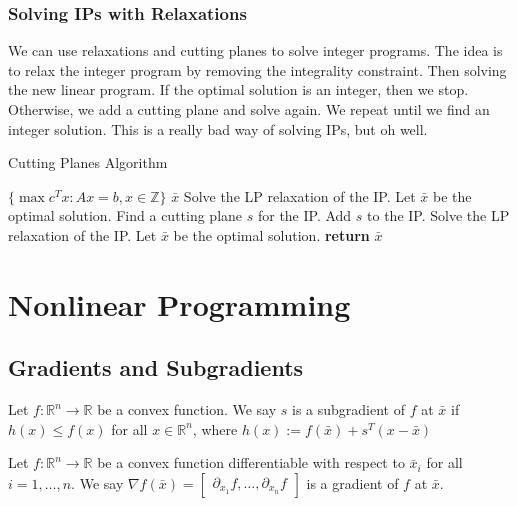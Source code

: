 \documentclass[a4paper]{report}
\begin{document}
\subsection{Solving IPs with Relaxations}
We can use relaxations and cutting planes to solve integer programs. The idea is to relax the integer program by removing the integrality constraint. Then solving the new linear program. If the optimal solution is an integer, then we stop. Otherwise, we add a cutting plane and solve again. We repeat until we find an integer solution. This is a really bad way of solving IPs, but oh well.

\begin{algorithm}
  \algrenewcommand{}
  \algrenewcommand{}
  \caption{Cutting Planes Algorithm}
  \label{alg:cut}
  \begin{algorithmic}[1]
    \Require $\{\max c^Tx : Ax = b, x \in \mathbb Z\}$
    \Ensure $\bar x$
    \State Solve the LP relaxation of the IP. Let $\bar x$ be the optimal solution.
      \State Find a cutting plane $s$ for the IP.
      \State Add $s$ to the IP.
      \State Solve the LP relaxation of the IP. Let $\bar x$ be the optimal solution.
    \EndWhile
    \State \textbf{return} $\bar x$
  \end{algorithmic}
\end{algorithm}


\chapter{Nonlinear Programming}
\section{Gradients and Subgradients}
\begin{definition}[Subgradient]\label{subgradient}
  Let $f : \mathbb R^n \rightarrow \mathbb R$ be a convex function. We say $s$ is a subgradient of $f$ at $\bar x$ if $h(x) \leq f(x)$ for all $x \in \mathbb R^n$, where $h(x) := f(\bar x) + s^T (x - \bar x)$
\end{definition}
\begin{definition}[Gradient]
  Let $f : \mathbb R^n \rightarrow \mathbb R$ be a convex function differentiable with respect to $\bar x_i$ for all $i = 1, \dots, n$. We say $\nabla f(\bar x) = \begin{bmatrix}\partial_{x_1}f, \dots, \partial_{x_n} f\end{bmatrix}$ is a gradient of $f$ at $\bar x$.
\end{definition}
\end{document}
